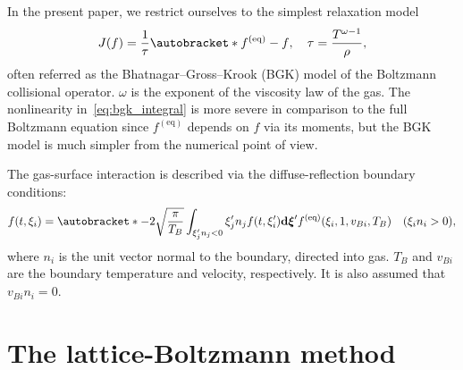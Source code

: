 \documentclass{article}
\newcommand{\dd}{\mathrm{d}}
\DeclarePairedDelimiter\autobracket()       %
\newcommand{\br}[1]{\autobracket*{#1}}
\newcommand{\dxi}{\boldsymbol{\dd\xi}}
\newcommand{\equil}[1]{#1^\mathrm{(eq)}}
\begin{document}
In the present paper, we restrict ourselves to the simplest relaxation model~\cite{Krook1954, Welander1954}
\begin{equation}\label{eq:bgk_integral}
    J(f) = \frac1\tau\br{\equil{f}-f}, \quad \tau = \frac{T^{\omega-1}}{\rho},
\end{equation}
often referred as the Bhatnagar--Gross--Krook (BGK) model of the Boltzmann collisional operator.
\(\omega\) is the exponent of the viscosity law of the gas.
The nonlinearity in~\eqref{eq:bgk_integral} is more severe in comparison to the full Boltzmann equation
since \(\equil{f}\) depends on \(f\) via its moments,
but the BGK model is much simpler from the numerical point of view.

The gas-surface interaction is described via the diffuse-reflection boundary conditions:
\begin{equation}\label{eq:diffuse}
    f(t,\xi_i) = \br{-2\sqrt\frac\pi{T_B} \int_{\xi'_jn_j<0}\xi'_jn_jf(t,\xi'_i)\dxi'}
        \equil{f}(\xi_i,1,v_{Bi},T_B) \quad (\xi_in_i>0),
\end{equation}
where \(n_i\) is the unit vector normal to the boundary, directed into gas.
\(T_B\) and \(v_{Bi}\) are the boundary temperature and velocity, respectively.
It is also assumed that \(v_{Bi}n_i = 0\).

\section{The lattice-Boltzmann method}
\end{document}
